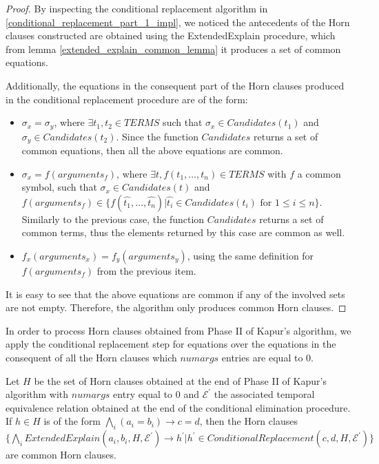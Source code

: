 \begin{proof}
  By inspecting the conditional replacement algorithm 
  in \ref{conditional_replacement_part_1_impl},
  we noticed the antecedents of the Horn clauses 
  constructed are obtained using the ExtendedExplain 
  procedure, which from lemma 
  \ref{extended_explain_common_lemma} 
  it produces a set of common equations.

  Additionally, the equations in the 
  consequent part 
  of the Horn clauses produced in the 
  conditional replacement 
  procedure are of the form:

  \begin{itemize}
    \item $\sigma_x = \sigma_y$, 
      where $\exists t_1, t_2 \in TERMS$
      such that $\sigma_x \in Candidates(t_1)$ and 
      $\sigma_y \in Candidates(t_2)$. Since the
      function $Candidates$ returns a set of 
      common equations, then all the above 
      equations are common.
    \item $\sigma_x = f(arguments_{f})$, 
      where $\exists t, f(t_1, \dots, t_n) \in TERMS$
      with $f$ a common symbol,
      such that $\sigma_x \in Candidates(t)$ and
      $f(arguments_f) \in 
      \{f(\hat{t_1}, \dots, \hat{t_n})
        |
        \hat{t_i} \in Candidates(t_i) \text{ for } 
        1 \leq i \leq n
      \}$. Similarly to the previous case, the
      function $Candidates$ returns a set of 
      common terms, thus the elements returned
      by this case are common as well.
    \item $f_x(arguments_x) = f_y(arguments_y)$, 
      using the same
      definition for $f(arguments_f)$ from 
      the previous item.
  \end{itemize}

  It is easy to see that the above 
  equations are common if any
  of the involved sets are not empty. 
  Therefore, the algorithm 
  only produces common Horn clauses.
\end{proof}

In order to process Horn clauses obtained 
from Phase II of Kapur's algorithm, we apply 
the conditional replacement step for equations
over the equations in the consequent of all 
the Horn clauses which $numargs$ entries are 
equal to 0.

\begin{lemma}
  Let $H$ be the set of Horn clauses
  obtained at the end of Phase II of Kapur's 
  algorithm with $numargs$ entry equal to 0 
  and $\mathcal{E^{'}}$ the associated
  temporal equivalence relation obtained 
  at the end of the conditional elimination 
  procedure. 
  If $h \in H$ is of the form $\bigwedge_i (a_i = b_i) 
  \rightarrow c = d$, then the Horn clauses
  $\{\bigwedge_i ExtendedExplain(a_i, b_i, H, \mathcal{E^{'}})
    \rightarrow h^{'}  | 
    h^{'} \in 
  ConditionalReplacement(c, d, H, \mathcal{E^{'}})\}$
  are common Horn clauses.
\end{lemma}

